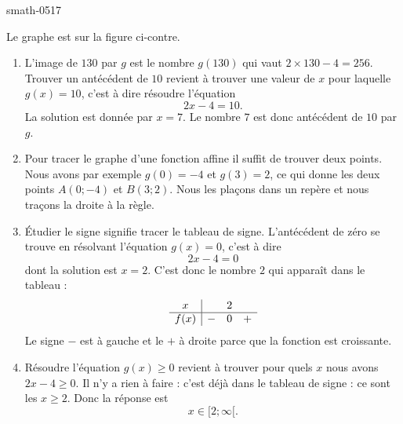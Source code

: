 
\begin{corrige}{smath-0517}

\begin{wrapfigure}[9]{r}{6.0cm}
   \vspace{-0.5cm}        %
   \centering
   
\end{wrapfigure}

Le graphe est sur la figure ci-contre.

    \begin{enumerate}
        \item
            L'image de \( 130\) par \( g\) est le nombre \( g(130)\) qui vaut \( 2\times 130-4=256\). Trouver un antécédent de \( 10\) revient à trouver une valeur de \( x\) pour laquelle \( g(x)=10\), c'est à dire résoudre l'équation
            \begin{equation}
                2x-4=10.
            \end{equation}
            La solution est donnée par \( x=7\). Le nombre \( 7\) est donc antécédent de \( 10\) par \( g\).

        \item
            Pour tracer le graphe d'une fonction affine il suffit de trouver deux points. Nous avons par exemple \( g(0)=-4\) et \( g(3)=2\), ce qui donne les deux points \( A(0;-4)\) et \( B(3;2)\). Nous les plaçons dans un repère et nous traçons la droite à la règle.

        \item

            Étudier le signe signifie tracer le tableau de signe. L'antécédent de zéro se trouve en résolvant l'équation \( g(x)=0\), c'est à dire
            \begin{equation}
                2x-4=0
            \end{equation}
            dont la solution est \( x=2\). C'est donc le nombre \( 2\) qui apparaît dans le tableau :
            \begin{equation*}
                \begin{array}[]{c|ccc}
                     x&&2&\\
                      \hline
                      f(x)&-&0&+\\ 
                       \end{array}
              \end{equation*}
              Le signe \( -\) est à gauche et le \( +\) à droite parce que la fonction est croissante.     
          \item
              Résoudre l'équation \( g(x)\geq 0\) revient à trouver pour quels \( x\) nous avons \( 2x-4\geq 0\). Il n'y a rien à faire : c'est déjà dans le tableau de signe : ce sont les \( x\geq 2\). Donc la réponse est
              \begin{equation}
                  x\in\mathopen[ 2; \infty [.
              \end{equation}
    \end{enumerate}

\end{corrige}
